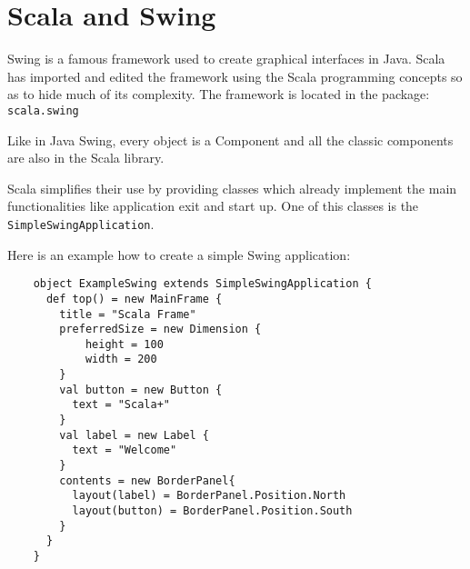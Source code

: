\documentclass[
	a4paper,					10pt,							twoside,					openright,				notitlepage,			parskip=half,			]{scrreprt}
\begin{document}
\section{Scala and Swing}
\label{sec:scala_swing}
Swing is a famous framework used to create graphical interfaces in Java. Scala has imported and edited the framework 
using the Scala programming concepts so as to hide much of its complexity. The framework is located in the package: \verb|scala.swing|

Like in Java Swing, every object is a Component and all the classic components are also in the Scala library.

Scala simplifies their use by providing classes which already implement the main functionalities like application exit and start up.
One of this classes is the \verb|SimpleSwingApplication|.

Here is an example how to create a simple Swing application:
\begin{lstlisting}
    object ExampleSwing extends SimpleSwingApplication {
      def top() = new MainFrame {
        title = "Scala Frame"
        preferredSize = new Dimension { 
        	height = 100
        	width = 200
        }
        val button = new Button {
          text = "Scala+"
        }
        val label = new Label {
          text = "Welcome"
        }
        contents = new BorderPanel{
          layout(label) = BorderPanel.Position.North
          layout(button) = BorderPanel.Position.South
        }        
      }
    }
\end{lstlisting}
\end{document}
